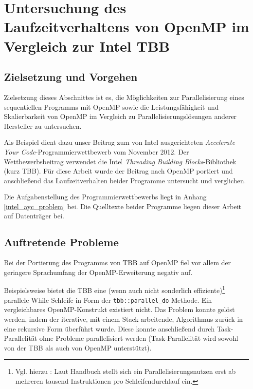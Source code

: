 \documentclass[11pt]{scrartcl}
\begin{document}

\pagebreak %



\section{Untersuchung des Laufzeitverhaltens von OpenMP im Vergleich zur Intel TBB}

\subsection{Zielsetzung und Vorgehen}

Zielsetzung dieses Abschnittes ist es, die Möglichkeiten zur Parallelisierung eines sequentiellen Programms mit OpenMP
sowie die Leistungsfähigkeit und Skalierbarkeit von OpenMP im Vergleich zu Parallelisierungslösungen anderer Hersteller
zu untersuchen.

Als Beispiel dient dazu unser Beitrag zum von Intel ausgerichteten \emph{Accelerate Your Code}-Programmierwettbewerb vom
November 2012. Der Wettbewerbsbeitrag verwendet die Intel \emph{Threading Building Blocks}-Bibliothek (kurz TBB). Für
diese Arbeit wurde der Beitrag nach OpenMP portiert und anschließend das Laufzeitverhalten beider Programme untersucht
und verglichen.

Die Aufgabenstellung des Programmierwettbewerbs liegt in Anhang \ref{intel_ayc_problem} bei. Die Quelltexte beider
Programme liegen dieser Arbeit auf Datenträger bei.

\subsection{Auftretende Probleme}

Bei der Portierung des Programms von TBB auf OpenMP fiel vor allem der geringere Sprachumfang der OpenMP-Erweiterung
negativ auf.

Beispielsweise bietet die TBB eine (wenn auch nicht sonderlich effiziente)\footnote{Vgl. hierzu \cite{intel_cook_2012}:
Laut Handbuch stellt sich ein Parallelisierungsnutzen erst ab mehreren tausend Instruktionen pro Schleifendurchlauf
ein.} parallele While-Schleife in Form der \texttt{tbb::parallel\_do}-Methode. Ein vergleichbares OpenMP-Konstrukt
existiert nicht. Das Problem konnte gelöst werden, indem der iterative, mit einem Stack arbeitende, Algorithmus zurück
in eine rekursive Form überführt wurde. Diese konnte anschließend durch Task-Parallelität ohne Probleme parallelisiert
werden (Task-Parallelität wird sowohl von der TBB als auch von OpenMP unterstützt).
\end{document}
